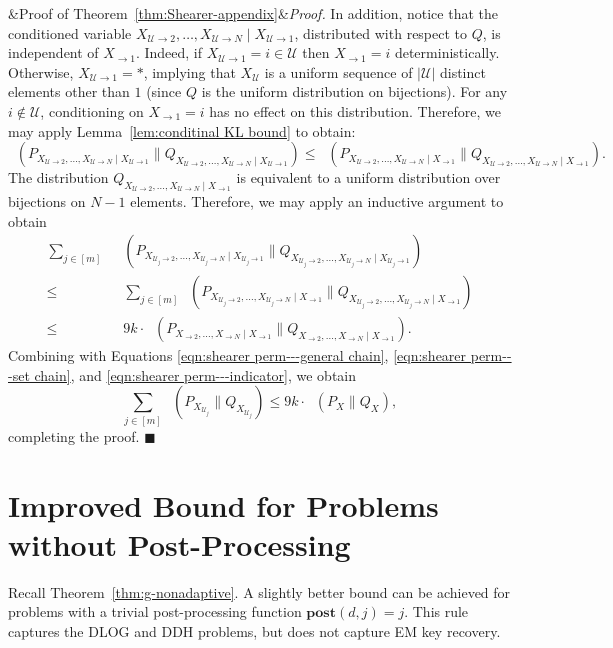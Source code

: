 \documentclass[11pt]{article}
\renewenvironment{proof}[1][]
    {\noindent
       \ifx&#1&{\it Proof.}
       \else{\it Proof ({#1}).}
       \fi}{\hfill $\blacksquare$}
\DeclareMathOperator{\KL}{D_{\text{KL}}}
\newcommand{\secv}{{d}}
\newcommand{\POST}{\boldsymbol{post}}
\begin{document}
\begin{proof}[Proof of Theorem~\ref{thm:Shearer-appendix}]
In addition, notice that the conditioned variable $X_{\mathcal{U}\to 2}, \dots, X_{\mathcal{U}\to N} \mid X_{\mathcal{U}\to 1}$, distributed with respect to $Q$, is independent of $X_{\to1}$. Indeed, if $X_{\mathcal{U}\to 1} = i \in \mathcal{U}$ then $X_{\to1} = i$ deterministically. Otherwise, $X_{\mathcal{U}\to 1} = *$, implying that $X_{\mathcal{U}}$ is a uniform sequence of $|\mathcal{U}|$ distinct elements other than $1$ (since $Q$ is the uniform distribution on bijections). For any $i \notin \mathcal{U}$, conditioning on $X_{\to 1} = i$ has no effect on this distribution. Therefore, we may apply Lemma~\ref{lem:conditinal KL bound} to obtain:
\[
    \KL\left(P_{X_{\mathcal{U}\to 2}, \dots, X_{\mathcal{U}\to N} \mid X_{\mathcal{U}\to 1}} \| Q_{X_{\mathcal{U}\to 2}, \dots, X_{\mathcal{U}\to N} \mid X_{\mathcal{U}\to 1}}\right) \le \KL\left(P_{X_{\mathcal{U}\to 2}, \dots, X_{\mathcal{U}\to N} \mid X_{\to 1}} \| Q_{X_{\mathcal{U}\to 2}, \dots, X_{\mathcal{U}\to N} \mid X_{\to 1}}\right).
\]
The distribution $Q_{X_{\mathcal{U}\to 2}, \dots, X_{\mathcal{U}\to N} \mid X_{\to 1}}$ is equivalent to a uniform distribution over bijections on $N-1$ elements. Therefore, we may apply an inductive argument to obtain
\begin{align*}
    \sum_{j \in [m]} \KL &\left(P_{X_{\mathcal{U}_j\to 2}, \dots, X_{\mathcal{U}_j\to N} \mid X_{\mathcal{U}_j\to 1}} \| Q_{X_{\mathcal{U}_j\to 2}, \dots, X_{\mathcal{U}_j\to N} \mid X_{\mathcal{U}_j\to 1}}\right)\\
    \le & \sum_{j \in [m]} \KL\left(P_{X_{\mathcal{U}_j\to 2}, \dots, X_{\mathcal{U}_j\to N} \mid X_{\to 1}} \| Q_{X_{\mathcal{U}_j\to 2}, \dots, X_{\mathcal{U}_j\to N} \mid X_{\to 1}}\right)\\
    \le & 9k\cdot \KL\left(P_{X_{\to 2}, \dots, X_{\to N} \mid X_{\to 1}} \| Q_{X_{\to 2}, \dots, X_{\to N} \mid X_{\to 1}}\right).
\end{align*}
Combining with Equations \eqref{eqn:shearer perm---general chain}, \eqref{eqn:shearer perm---set chain}, and \eqref{eqn:shearer perm---indicator}, we obtain
\[
    \sum_{j \in [m]} \KL( P_{X_{\mathcal{U}_j}} \| Q_{X_{\mathcal{U}_j}} ) \le 9k \cdot  \KL( P_X \| Q_X ),
\]
completing the proof.
\end{proof}

\section{Improved Bound for Problems without Post-Processing}
\label{app:improvement no post process}
Recall Theorem~\ref{thm:g-nonadaptive}. A slightly better bound can be achieved for problems with a trivial post-processing function $\POST(\secv,j)=j$. This rule captures the DLOG and DDH problems, but does not capture EM key recovery.
\end{document}
